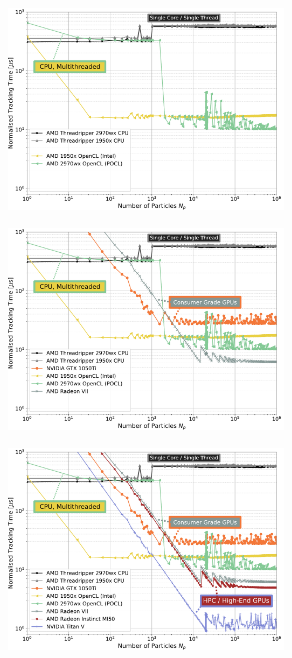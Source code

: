 \documentclass{beamer}
\begin{document}
\begin{frame}
{    }
    {
        \begin{figure}[H]
            \centering
            \includegraphics[width=0.65\textwidth]{presentation_images/baseline_benchmark_overview_02}
        \end{figure}
    }
    {
        \begin{figure}[H]
            \centering
            \includegraphics[width=0.65\textwidth]{presentation_images/baseline_benchmark_overview_03}
        \end{figure}
    }
    {
        \begin{figure}[H]
            \centering
            \includegraphics[width=0.65\textwidth]{presentation_images/baseline_benchmark_overview_04}

\end{figure}}
\end{frame}
\end{document}
